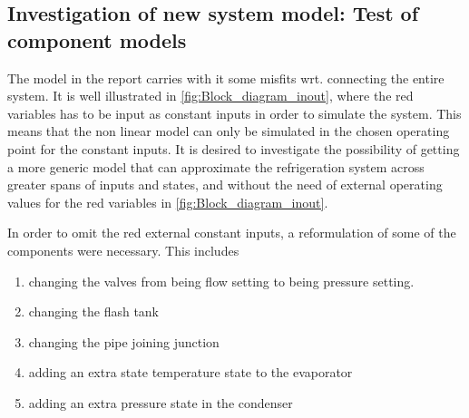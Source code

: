 \subsection{Investigation of new system model: Test of component models} \label{app:tj_2}
The model in the report carries with it some misfits wrt. connecting the entire system. It is well illustrated in \cref{fig:Block_diagram_inout}, where the red variables has to be input as constant inputs in order to simulate the system. This means that the non linear model can only be simulated in the chosen operating point for the constant inputs. It is desired to investigate the possibility of getting a more generic model that can approximate the refrigeration system across greater spans of inputs and states, and without the need of external operating values for the red variables in \cref{fig:Block_diagram_inout}.

In order to omit the red external constant inputs, a reformulation of some of the components were necessary. This includes 
\begin{enumerate}
	\item changing the valves from being flow setting to being pressure setting.
	\item changing the flash tank
	\item changing the pipe joining junction
	\item adding an extra state temperature state to the evaporator
	\item adding an extra pressure state in the condenser
\end{enumerate}
 
 
